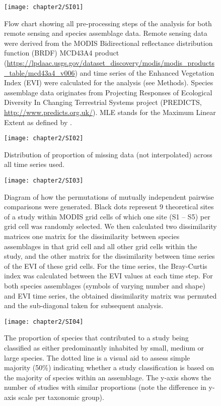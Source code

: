 \begin{figure}[h]
\centering
\texttt{[image: chapter2/SI01]}
\caption{ Flow chart showing all pre-processing steps of the analysis for both remote sensing and species assemblage data. Remote sensing data were derived from the MODIS Bidirectional reflectance distribution function (BRDF) MCD43A4 product (\href{https://lpdaac.usgs.gov/dataset_discovery/modis/modis_products_table/mcd43a4_v006}{https://lpdaac.usgs.gov/dataset_discovery/modis/modis_products_table/mcd43a4_v006}) and time series of the Enhanced Vegetation Index (EVI) were calculated for the analysis (see Methods). Species assemblage data originates from Projecting Responses of Ecological Diversity In Changing Terrestrial Systems project (PREDICTS, \href{http://www.predicts.org.uk/}{http://www.predicts.org.uk/}). MLE stands for the Maximum Linear Extent as defined by \citep{Hudson2016}.}
\label{SI02_01}
\end{figure}

\begin{figure}[h]
\centering
\texttt{[image: chapter2/SI02]}
\caption{ Distribution of proportion of missing data (not interpolated) across all time series used. }
\label{SI02_02}
\end{figure}

\begin{figure}[h]
\centering
\texttt{[image: chapter2/SI03]}
\caption{ Diagram of how the permutations of mutually independent pairwise comparisons were generated. Black dots represent 9 theoretical sites of a study within MODIS grid cells of which one site (S1 – S5) per grid cell was randomly selected. We then calculated two dissimilarity matrices one matrix for the dissimilarity between species assemblages in that grid cell and all other grid cells within the study, and the other matrix for the dissimilarity between time series of the EVI of these grid cells.  For the time series, the Bray-Curtis index was calculated between the EVI values at each time step. For both species assemblages (symbols of varying number and shape) and EVI time series, the obtained dissimilarity matrix was permuted and the sub-diagonal taken for subsequent analysis. }
\label{SI02_03}
\end{figure}

\begin{figure}[h]
\centering
\texttt{[image: chapter2/SI04]}
\caption{ The proportion of species that contributed to a study being classified as either predominantly inhabited by small, medium or large species. The dotted line is a visual aid to assess simple majority (50\%) indicating whether a study classification is based on the majority of species within an assemblage. The y-axis shows the number of studies with similar proportions (note the difference in y-axis scale per taxonomic group). }
\label{SI02_04}
\end{figure}

